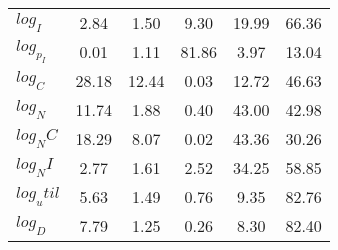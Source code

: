 \begin{center}
\begin{longtable}{lccccc}
$log_I     $	 & 	        2.84	 & 	        1.50	 & 	        9.30	 & 	       19.99	 & 	       66.36 \\ 
$log_p_I   $	 & 	        0.01	 & 	        1.11	 & 	       81.86	 & 	        3.97	 & 	       13.04 \\ 
$log_C     $	 & 	       28.18	 & 	       12.44	 & 	        0.03	 & 	       12.72	 & 	       46.63 \\ 
$log_N     $	 & 	       11.74	 & 	        1.88	 & 	        0.40	 & 	       43.00	 & 	       42.98 \\ 
$log_NC    $	 & 	       18.29	 & 	        8.07	 & 	        0.02	 & 	       43.36	 & 	       30.26 \\ 
$log_NI    $	 & 	        2.77	 & 	        1.61	 & 	        2.52	 & 	       34.25	 & 	       58.85 \\ 
$log_util  $	 & 	        5.63	 & 	        1.49	 & 	        0.76	 & 	        9.35	 & 	       82.76 \\ 
$log_D     $	 & 	        7.79	 & 	        1.25	 & 	        0.26	 & 	        8.30	 & 	       82.40 \\ 
\end{longtable}
 \end{center}
